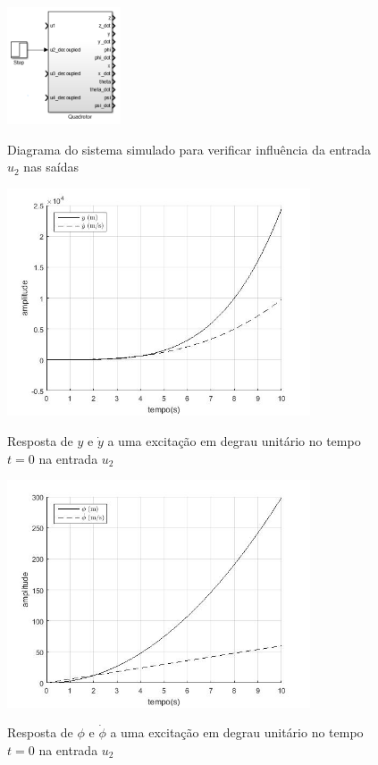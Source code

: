 \begin{figure}[!htb]
    \centering
    \caption{Diagrama do sistema simulado para verificar influência da entrada $u_2$ nas saídas}
    \includegraphics[width=0.3\textwidth]{./04-figuras/resultados/malha_aberta/resultados_bloco_quadrotor_entrada_u2}
    \label{fig:resultados_bloco_quadrotor_entrada_u2}
\end{figure}

\begin{figure}[!htb]
    \centering
    \caption{Resposta de $y$ e $\dot{y}$ a uma excitação em degrau unitário no tempo $t=0$ na entrada $u_2$}
    \includegraphics[width=0.8\textwidth]{./04-figuras/resultados/malha_aberta/u2_y}
    \label{fig:resultados_malha_aberta_u2_y}
\end{figure}
\begin{figure}[!htb]
    \centering
    \caption{Resposta de $\phi$ e $\dot{\phi}$ a uma excitação em degrau unitário no tempo $t=0$ na entrada $u_2$}
    \includegraphics[width=0.8\textwidth]{./04-figuras/resultados/malha_aberta/u2_phi}
    \label{fig:resultados_malha_aberta_u2_phi}
\end{figure}


